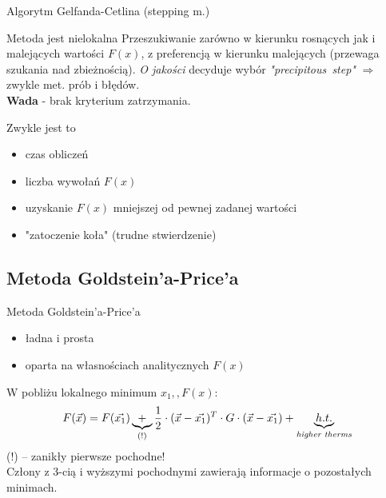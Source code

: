   \begin{frame}{Algorytm Gelfanda-Cetlina (stepping m.)}
    \begin{block}{Metoda jest nielokalna}
      Przeszukiwanie zarówno w kierunku rosnących jak i
      malejących wartości $F(x)$, z preferencją w kierunku
      malejących (przewaga szukania nad zbieżnością).
      \emph{O jakości} decyduje wybór \emph{"precipitous~step"}
      $\Rightarrow$ zwykle met. prób i błędów.\\
      \textbf{Wada} - brak kryterium zatrzymania.
    \end{block}

    \begin{block}{Zwykle jest to}
      \begin{itemize}
        \item czas obliczeń
        \item liczba wywołań $F(x)$
        \item uzyskanie $F(x)$ mniejszej od pewnej zadanej
        wartości
        \item "zatoczenie koła" (trudne stwierdzenie)
      \end{itemize}
    \end{block}
  \end{frame}

  \subsection{Metoda Goldstein'a-Price'a}

  \begin{frame}{Metoda Goldstein'a-Price'a}
    \begin{itemize}
      \item ładna i prosta
      \item oparta na własnościach analitycznych $F(x)$
    \end{itemize}
    W pobliżu lokalnego minimum $x_{1}{,}, F(x)$:
    \begin{displaymath}
      F(\vec{x})=F(\vec{x_{1}}) \underbrace{+}_{(!)}
      \frac{1}{2} \cdot (\vec{x} - \vec{x_{1}})^T \cdot
      G \cdot (\vec{x} - \vec{x_{1}}) +
      \underbrace{h.t.}_{\text{\emph{higher therms}}}
    \end{displaymath}
    (!) -- zanikły pierwsze pochodne!\\
    \smallskip
    Człony z 3-cią i wyższymi pochodnymi zawierają informacje
    o pozostałych minimach.
  \end{frame}


